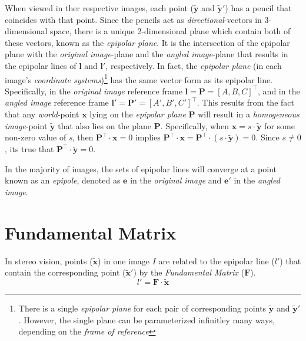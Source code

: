 \par When viewed in ther respective images, each point ($\mathbf{\tilde{y}}$ and $\mathbf{\tilde{y}'}$) has a pencil that coincides with that point. Since the pencils act as \textit{directional}-vectors in 3-dimensional space, there is a unique 2-dimensional plane which contain both of these vectors, known as the \textit{epipolar plane}. It is the intersection of the epipolar plane with the \textit{original image}-plane and the \textit{angled image}-plane that results in the epipolar lines of $\mathbf{l}$ and $\mathbf{l'}$, respectively. In fact, the \textit{epipolar plane} (in each image's \textit{coordinate systems})\footnote{There is a single \textit{epipolar plane} for each pair of corresponding points $\mathbf{\tilde{y}}$ and $\mathbf{\tilde{y}'}$. However, the single plane can be parameterized infinitley many ways, depending on the \textit{frame of reference}} has the same vector form as its epipolar line. Specifically, in the \textit{original image} reference frame $\mathbf{l}=\mathbf{P}=[A,B,C]^\intercal$, and in the \textit{angled image} reference frame $\mathbf{l'}=\mathbf{P'}=[A',B',C']^\intercal$. This results from the fact that any \textit{world}-point $\mathbf{x}$ lying on the \textit{epipolar plane} $\mathbf{P}$ will result in a \textit{homogeneous image}-point $\mathbf{\tilde{y}}$ that also lies on the plane $\mathbf{P}$. Specifically, when $\mathbf{x}=s\cdot\mathbf{\tilde{y}}$ for some non-zero value of \textit{s}, then $\mathbf{P}^\intercal\cdot\mathbf{x}=0$ implies $\mathbf{P}^\intercal\cdot\mathbf{x}=\mathbf{P}^\intercal\cdot(s\cdot\mathbf{\tilde{y}})=0$. Since $s\neq0$, its true that $\mathbf{P}^\intercal\cdot\mathbf{\tilde{y}}=0$. 

\par In the majority of images, the sets of epipolar lines will converge at a point known as an \textit{epipole}, denoted as $\mathbf{e}$ in the \textit{original image} and $\mathbf{e'}$ in the \textit{angled image}. 

\section{Fundamental Matrix}

\par In stereo vision, points ($\mathbf{\tilde{x}}$) in one image $I$ are related to the epipolar line ($l'$) that contain the corresponding point ($\mathbf{\tilde{x}}'$) by the \textit{Fundamental Matrix} ($\mathbf{F}$).
\begin{equation*}
l'=\mathbf{F}\cdot\mathbf{\tilde{x}}
\end{equation*}

